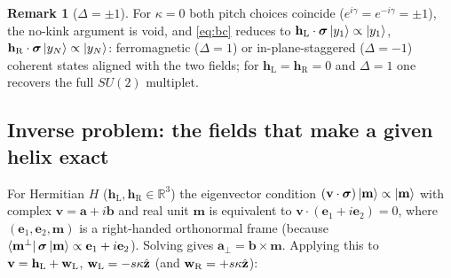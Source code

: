 \documentclass[11pt,a4paper]{article}
\theoremstyle{definition}
\newtheorem{remark}[theorem]{Remark}
\newcommand{\hL}{\mathbf h_{\mathrm L}}
\newcommand{\hR}{\mathbf h_{\mathrm R}}
\newcommand{\bsig}{\boldsymbol\sigma}
\newcommand{\ez}{\hat{\mathbf z}}
\begin{document}
\begin{remark}[$\Delta=\pm1$]
For $\kappa=0$ both pitch choices coincide ($e^{i\gamma}=e^{-i\gamma}=\pm1$), the no-kink argument is void, and \eqref{eq:bc} reduces to $\hL\cdot\bsig\ket{y_1}\propto\ket{y_1}$, $\hR\cdot\bsig\ket{y_N}\propto\ket{y_N}$: ferromagnetic ($\Delta=1$) or in-plane-staggered ($\Delta=-1$) coherent states aligned with the two fields; for $\hL=\hR=0$ and $\Delta=1$ one recovers the full $SU(2)$ multiplet.
\end{remark}

\subsection{Inverse problem: the fields that make a given helix exact}\label{sec:inverse}
For Hermitian $H$ ($\hL,\hR\in\mathbb R^3$) the eigenvector condition $(\mathbf v\cdot\bsig)\ket{\mathbf m}\propto\ket{\mathbf m}$ with complex $\mathbf v=\mathbf a+i\mathbf b$ and real unit $\mathbf m$ is equivalent to $\mathbf v\cdot(\mathbf e_1+i\mathbf e_2)=0$, where $(\mathbf e_1,\mathbf e_2,\mathbf m)$ is a right-handed orthonormal frame (because $\bra{\mathbf m^\perp}\bsig\ket{\mathbf m}\propto\mathbf e_1+i\mathbf e_2$). Solving gives $\mathbf a_\perp=\mathbf b\times\mathbf m$. Applying this to $\mathbf v=\hL+\mathbf w_{\rm L}$, $\mathbf w_{\rm L}=-s\kappa\ez$ (and $\mathbf w_{\rm R}=+s\kappa\ez$):
\end{document}
